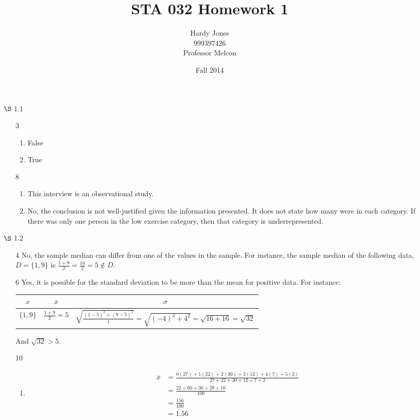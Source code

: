 \documentclass[12pt,letterpaper]{article}
\title{STA 032 Homework 1\vspace{-2ex}}
\author{Hardy Jones\\
        999397426\\
        Professor Melcon\vspace{-2ex}}
\date{Fall 2014}
\begin{document}
  \maketitle

  \begin{enumerate}
    \item [$\S$ 1.1]
      \begin{enumerate}
        \item [3]
          \begin{enumerate}
            \item False
            \item True
          \end{enumerate}
        \item [8]
          \begin{enumerate}
            \item This interview is an observational study.
            \item
              No, the conclusion is not well-justified given the information presented.
              It does not state how many were in each category.
              If there was only one person in the low exercise category,
              then that category is underrepresented.
          \end{enumerate}
      \end{enumerate}

    \item [$\S$ 1.2]
      \begin{enumerate}
        \item [4]
          No, the sample median can differ from one of the values in the sample.
          For instance, the sample median of the following data,
          $D = \{1, 9\}$
          is $\frac{1 + 9}{2} = \frac{10}{2} = 5 \notin D$.
        \item [6]
          Yes, it is possible for the standard deviation to be more than the mean for positive data.
          For instance:

          \begin{tabular}{c | c | c}
            $x$        & $\overline{x}$        & $\sigma$ \\
            \hline
            $\{1, 9\}$ & $\frac{1 + 9}{2} = 5$ & $\sqrt{\frac{(1-5)^2 + (9 - 5)^2}{1}} = \sqrt{(-4)^2 + 4^2} = \sqrt{16 + 16} = \sqrt{32}$
          \end{tabular}

          And $\sqrt{32} > 5$.
        \item [10]
          \begin{enumerate}[label=\arabic* )]
            \item
              \begin{align*}
                \overline{x} &= \frac{0(27) + 1(22) + 2(30) + 3(12) + 4(7) + 5(2)}{27 + 22 + 30 + 12 + 7 + 2} \\
                &= \frac{22 + 60 + 36 + 28 + 10}{100} \\
                &= \frac{156}{100} \\
                &= 1.56
              \end{align*}


\end{enumerate}
\end{enumerate}
\end{enumerate}
\end{document}
